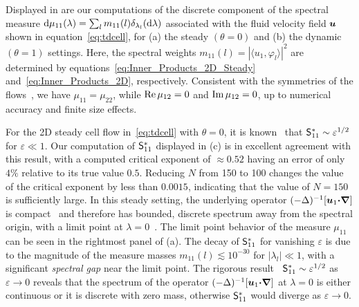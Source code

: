 \documentclass[amsa]{ipart}
\begin{document}
Displayed in  are our
computations of the discrete component of the spectral measure
$\mathrm{d}\mu_{11}(\lambda)=\sum_lm_{11}(l)\delta_{\lambda_l}(\mathrm{d}\lambda)$ associated with the fluid
velocity field $\boldsymbol{u}$ shown in equation~\eqref{eq:tdcell}, for (a)
the steady $(\theta=0)$ and (b) the dynamic $(\theta=1)$ settings. Here, the
spectral weights $m_{11}(l)=|\langle u_1,\varphi_l\rangle|^2$ are determined by
equations~\eqref{eq:Inner_Products_2D_Steady}
and~\eqref{eq:Inner_Products_2D}, respectively.  Consistent with the
symmetries of the flows~\cite{Biferale:PF:2725}, we have
$\mu_{11}=\mu_{22}$, while $\mbox{Re}\,\mu_{12}=0$ and $\mbox{Im}\,\mu_{12}=0$, up to
numerical accuracy and finite size effects.




For the 2D steady cell
flow in~\eqref{eq:tdcell} with $\theta=0$, it is
known~\cite{Fannjiang:1994:SIAM_JAM:333,Novikov:2005:CPAM:867} that
$\mathsf{S}^*_{11}\sim\varepsilon^{1/2}$ for $\varepsilon\ll1$. Our computation of $\mathsf{S}^*_{11}$
displayed in (c) is in
excellent agreement with this result, with a computed critical
exponent of $\approx0.52$ having an error of only $4\%$ relative to its true
value $0.5$. Reducing $N$ from 150 to 100 changes the value of the
critical exponent by less than $0.0015$, indicating that the value of
$N=150$ is sufficiently large. In this steady setting, the underlying
operator $(-\Delta)^{-1}[\boldsymbol{u}_1\mbox{\boldmath${\cdot}$}\mbox{\boldmath${\nabla}$}]$ is
compact~\cite{Bhattacharya:AAP:1999:951} and therefore has 
bounded, discrete spectrum away from the spectral origin, with a limit
point at $\lambda=0$~\cite{Stakgold:BVP:2000}. The limit point behavior of  
the measure $\mu_{11}$ can be seen in the rightmost panel of
(a). The decay of $\mathsf{S}^*_{11}$
for vanishing $\varepsilon$ is due to the magnitude of the measure masses
$m_{11}(l)\lesssim10^{-30}$ for $|\lambda_l|\ll1$, with a significant \emph{spectral
  gap} near the limit point. The rigorous
result~\cite{Fannjiang:1994:SIAM_JAM:333,Novikov:2005:CPAM:867} $\mathsf{S}^*_{11}\sim\varepsilon^{1/2}$ as
$\varepsilon\to0$ reveals that the spectrum of the operator
$(-\Delta)^{-1}[\boldsymbol{u}_1\mbox{\boldmath${\cdot}$}\mbox{\boldmath${\nabla}$}]$ at $\lambda=0$ is either
continuous or it is discrete with zero mass,
otherwise $\mathsf{S}^*_{11}$ would diverge as $\varepsilon\to0$.  
\end{document}
